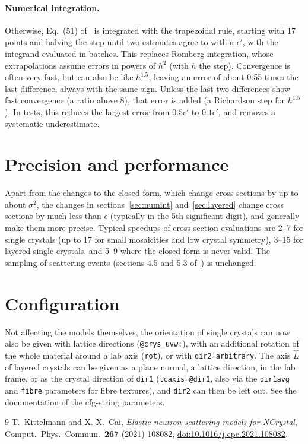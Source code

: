 \documentclass[11pt,a4paper]{article}
\newcommand{\Eq}[1]{Eq.~(#1) of~\cite{elastic}}
\begin{document}
\paragraph{Numerical integration.} Otherwise, \Eq{51} is integrated with the
trapezoidal rule, starting with 17 points and halving the step until two
estimates agree to within $\epsilon'$, with the integrand evaluated in
batches. This replaces Romberg integration, whose extrapolations assume
errors in powers of $h^2$ (with $h$ the step). Convergence is often very
fast, but can also be like $h^{1.5}$, leaving an error of about 0.55 times
the last difference, always with the same sign. Unless the last two
differences show fast convergence (a ratio above 8), that error is added
(a Richardson step for $h^{1.5}$). In tests, this reduces the largest error
from $0.5\epsilon'$ to $0.1\epsilon'$, and removes a systematic
underestimate.

\section{Precision and performance}

Apart from the changes to the closed form, which change cross sections by up
to about $\sigma^2$, the changes in sections~\ref{sec:numint}
and~\ref{sec:layered} change
cross sections by much less than $\epsilon$ (typically in the 5th significant
digit), and generally make them more precise. Typical speedups of cross
section evaluations are 2--7 for single crystals (up to 17 for small
mosaicities and low crystal symmetry), 3--15 for layered single crystals, and
5--9 where the closed form is never valid. The sampling of scattering events
(sections 4.5 and 5.3 of~\cite{elastic}) is unchanged.

\section{Configuration}

Not affecting the models themselves, the orientation of single crystals can
now also be given with lattice directions (\texttt{@crys\_uvw:}), with an
additional rotation of the whole material around a lab axis (\texttt{rot}),
or with \texttt{dir2=arbitrary}. The axis $\hat L$ of layered crystals can be
given as a plane normal, a lattice direction, in the lab frame, or as the
crystal direction of \texttt{dir1} (\texttt{lcaxis=@dir1}, also via the
\texttt{dir1avg} and \texttt{fibre} parameters for fibre textures), and
\texttt{dir2} can then be left out. See the documentation of the cfg-string
parameters.

\begin{thebibliography}{9}
 T.~Kittelmann and X.-X.~Cai, \emph{Elastic neutron
  scattering models for NCrystal}, Comput.\ Phys.\ Commun.\ \textbf{267}
  (2021) 108082, \href{https://doi.org/10.1016/j.cpc.2021.108082}%
  {doi:10.1016/j.cpc.2021.108082}.
\end{thebibliography}
\end{document}
